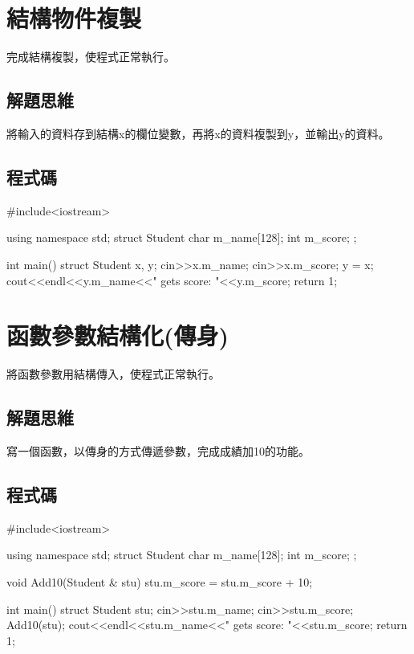 \section{結構物件複製}
完成結構複製，使程式正常執行。

\subsection{解題思維}

將輸入的資料存到結構x的欄位變數，再將x的資料複製到y，並輸出y的資料。

\subsection{程式碼}
\begin{cppcode}
	#include<iostream>
	
	using namespace std;
	struct Student {
		char m_name[128];
		int m_score;
	};
	
	int main()
	{
		struct Student x, y;
		cin>>x.m_name;
		cin>>x.m_score;
		y = x;
		cout<<endl<<y.m_name<<" gets score: "<<y.m_score;
		return 1;
	}
\end{cppcode}

\section{函數參數結構化(傳身)}
將函數參數用結構傳入，使程式正常執行。

\subsection{解題思維}

寫一個函數，以傳身的方式傳遞參數，完成成績加10的功能。 

\subsection{程式碼}
\begin{cppcode}
	#include<iostream>
	
	using namespace std;
	struct Student {
		char m_name[128];
		int m_score;
	};
	
	void Add10(Student & stu)
	{
		stu.m_score = stu.m_score + 10;
	}
	
	int main()
	{
		struct Student stu;
		cin>>stu.m_name;
		cin>>stu.m_score;
		Add10(stu);
		cout<<endl<<stu.m_name<<" gets score: "<<stu.m_score;
		return 1;
	}
\end{cppcode}

